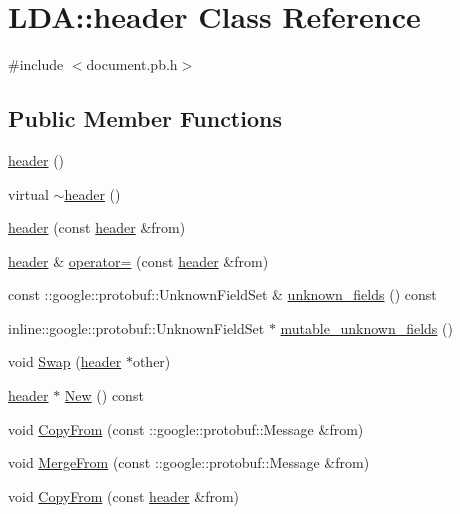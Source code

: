 \hypertarget{class_l_d_a_1_1header}{
\section{LDA::header Class Reference}
\label{class_l_d_a_1_1header}
}


{\ttfamily \#include $<$document.pb.h$>$}

\subsection*{Public Member Functions}
\begin{DoxyCompactItemize}
\item 
\hyperlink{class_l_d_a_1_1header_acc6edc4e73755b81ac741fb568104096}{header} ()
\item 
virtual \hyperlink{class_l_d_a_1_1header_af730dfe7c1b7593631cf5a2661286626}{$\sim$header} ()
\item 
\hyperlink{class_l_d_a_1_1header_a9ee9cd4522731899b49805b891b3835f}{header} (const \hyperlink{class_l_d_a_1_1header}{header} \&from)
\item 
\hyperlink{class_l_d_a_1_1header}{header} \& \hyperlink{class_l_d_a_1_1header_ad6839153af87a9405065eecff9af44a9}{operator=} (const \hyperlink{class_l_d_a_1_1header}{header} \&from)
\item 
const ::google::protobuf::UnknownFieldSet \& \hyperlink{class_l_d_a_1_1header_aa9be1901acecc89bb08029bdef35cc4f}{unknown\_\-fields} () const 
\item 
inline::google::protobuf::UnknownFieldSet $\ast$ \hyperlink{class_l_d_a_1_1header_a760a263c4ea3c6ead8dc5559c3c5595d}{mutable\_\-unknown\_\-fields} ()
\item 
void \hyperlink{class_l_d_a_1_1header_a844cd05d4bf42f36c1d5e22910582173}{Swap} (\hyperlink{class_l_d_a_1_1header}{header} $\ast$other)
\item 
\hyperlink{class_l_d_a_1_1header}{header} $\ast$ \hyperlink{class_l_d_a_1_1header_ac86a02dd1ae80fac5d3e70486d5cc887}{New} () const 
\item 
void \hyperlink{class_l_d_a_1_1header_a828584601b36d9c982f53f8924934b49}{CopyFrom} (const ::google::protobuf::Message \&from)
\item 
void \hyperlink{class_l_d_a_1_1header_a16b2cf35b0f0d49031c993423f01c80e}{MergeFrom} (const ::google::protobuf::Message \&from)
\item 
void \hyperlink{class_l_d_a_1_1header_a3282db68eb557717e0f127a54b029335}{CopyFrom} (const \hyperlink{class_l_d_a_1_1header}{header} \&from)

\end{DoxyCompactItemize}

